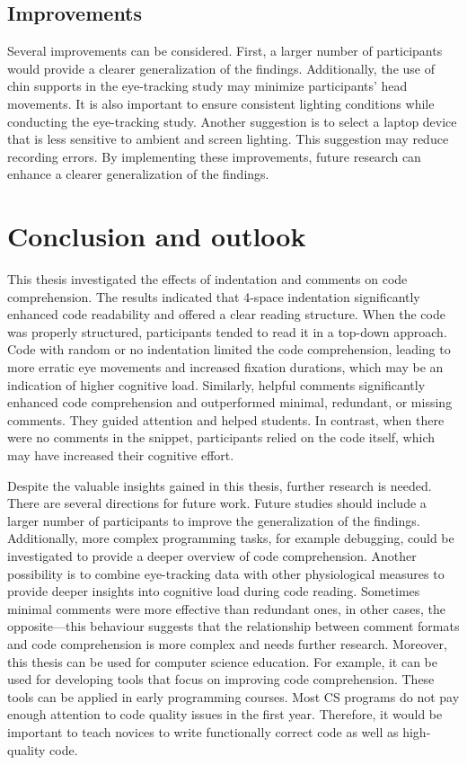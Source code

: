 \section{Improvements}

Several improvements can be considered. First, a larger number of participants would provide a clearer generalization of the findings. Additionally, the use of chin supports in the eye-tracking study may minimize participants’ head movements. It is also important to ensure consistent lighting conditions while conducting the eye-tracking study. Another suggestion is to select a laptop device that is less sensitive to ambient and screen lighting. This suggestion may reduce recording errors. By implementing these improvements, future research can enhance a clearer generalization of the findings. 





\chapter{Conclusion and outlook}
\label{sec:conclusion}

This thesis investigated the effects of indentation and comments on code comprehension. The results indicated that 4-space indentation significantly enhanced code readability and offered a clear reading structure. When the code was properly structured, participants tended to read it in a top-down approach. Code with random or no indentation limited the code comprehension, leading to more erratic eye movements and increased fixation durations, which may be an indication of higher cognitive load.  Similarly, helpful comments significantly enhanced code comprehension and outperformed minimal, redundant, or missing comments.  They guided attention and helped students. In contrast, when there were no comments in the snippet, participants relied on the code itself, which may have increased their cognitive effort.
 
Despite the valuable insights gained in this thesis, further research is needed. There are several directions for future work.  Future studies should include a larger number of participants to improve the generalization of the findings. Additionally, more complex programming tasks, for example debugging, could be investigated to provide a deeper overview of code comprehension. Another possibility is to combine eye-tracking data with other physiological measures to provide deeper insights into cognitive load during code reading. Sometimes minimal comments were more effective than redundant ones, in other cases, the opposite—this behaviour suggests that the relationship between comment formats and code comprehension is more complex and needs further research.  Moreover, this thesis can be used for computer science education. For example, it can be used for developing tools that focus on improving code comprehension. These tools can be applied in early programming courses. Most CS programs do not pay enough attention to code quality issues in the first year. Therefore, it would be important to teach novices to write functionally correct code as well as high-quality code.   


